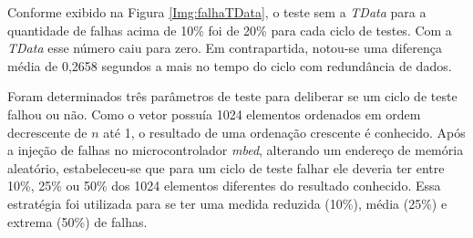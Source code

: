Conforme exibido na Figura \ref{Img:falhaTData}, o teste sem a \textit{TData} para a quantidade de falhas acima de 10\% foi de 20\% para cada ciclo de testes. Com a \textit{TData} esse número caiu para zero. Em contrapartida, notou-se uma diferença média de 0,2658 segundos a mais no tempo do ciclo com redundância de dados. 

Foram determinados três parâmetros de teste para deliberar se um ciclo de teste falhou ou não. Como o vetor possuía 1024 elementos ordenados em ordem decrescente de $n$ até 1, o resultado de uma ordenação crescente é conhecido. Após a injeção de falhas no microcontrolador \textit{mbed}, alterando um endereço de memória aleatório, estabeleceu-se que para um ciclo de teste falhar ele deveria ter entre 10\%, 25\% ou 50\% dos 1024 elementos diferentes do resultado conhecido. Essa estratégia foi utilizada para se ter uma medida reduzida (10\%), média (25\%) e extrema (50\%) de falhas.




